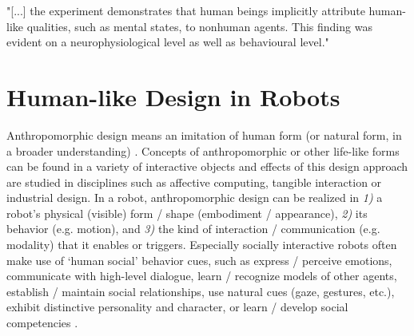 \documentclass[twocolumn]{svjour3}          %
\begin{document}
	
	

	


	

	"[...] the experiment demonstrates that human beings implicitly attribute human-like qualities, such as mental states, to nonhuman agents. This finding was evident on a neurophysiological level as well as behavioural level." \cite{hegel_understanding_2008}
	


	


%
%
%
%
%
%


\section{Human-like Design in Robots}
\label{sec:4}

	Anthropomorphic design means an imitation of human form (or natural form, in a broader understanding) \cite{disalvo_seduction_2003}. Concepts of anthropomorphic or other life-like forms can be found in a variety of interactive objects and effects of this design approach are studied in disciplines such as affective computing, tangible interaction or industrial design. In a robot, anthropomorphic design can be realized in \textit{1)} a robot's physical (visible) form / shape (embodiment / appearance), \textit{2)} its behavior (e.g. motion), and \textit{3)} the kind of interaction / communication (e.g. modality) that it enables or triggers. Especially socially interactive robots often make use of `human social' behavior cues, such as express / perceive emotions, communicate with high-level dialogue, learn / recognize models of other agents, establish / maintain social relationships, use natural cues (gaze, gestures, etc.), exhibit distinctive personality and character, or learn / develop social competencies \cite{fong_survey_2003}.
 
\end{document}
